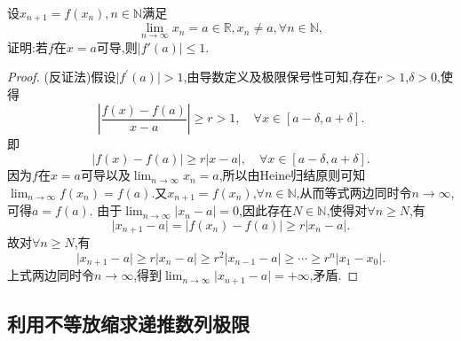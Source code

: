 \documentclass[../../main.tex]{subfiles}%
\begin{document}
\begin{proposition}[反向压缩映像]\label{proposition:反向压缩映像}
设\(x_{n + 1} = f(x_n),n\in\mathbb{N}\)满足
\[
\lim_{n \to \infty} x_n = a\in\mathbb{R},x_n\neq a,\forall n\in\mathbb{N},
\]
证明:若\(f\)在\(x = a\)可导,则\(\vert f'(a)\vert\leqslant  1\).
\end{proposition}
\begin{proof}
(反证法)假设\(\vert f^\prime(a)\vert > 1\),由导数定义及极限保号性可知,存在\(r > 1\),\(\delta > 0\),使得
\[
\left\vert\frac{f(x) - f(a)}{x - a}\right\vert\geqslant r > 1, \quad\forall x\in [a - \delta, a + \delta].
\]
即
\[
\vert f(x) - f(a)\vert\geqslant r\vert x - a\vert, \quad\forall x\in [a - \delta, a + \delta].
\]
因为\(f\)在\(x = a\)可导以及\(\lim_{n\rightarrow\infty}x_n = a\),所以由Heine归结原则可知\(\lim_{n\rightarrow\infty}f(x_n) = f(a)\).又\(x_{n + 1} = f(x_n)\),\(\forall n\in\mathbb{N}\),从而等式两边同时令\(n\rightarrow\infty\),可得\(a = f(a)\).
由于\(\lim_{n\rightarrow\infty}\vert x_n - a\vert = 0\),因此存在\(N\in\mathbb{N}\),使得对\(\forall n\geqslant N\),有
\[
\vert x_{n + 1} - a\vert = \vert f(x_n) - f(a)\vert\geqslant r\vert x_n - a\vert.
\]
故对\(\forall n\geqslant N\),有
\[
\vert x_{n + 1} - a\vert\geqslant r\vert x_n - a\vert\geqslant r^2\vert x_{n - 1} - a\vert\geqslant\cdots\geqslant r^n\vert x_1 - x_0\vert.
\]
上式两边同时令\(n\rightarrow\infty\),得到\(\lim_{n\rightarrow\infty}\vert x_{n + 1} - a\vert = +\infty\),矛盾.
\end{proof}


\subsection{利用不等放缩求递推数列极限}
\end{document}
